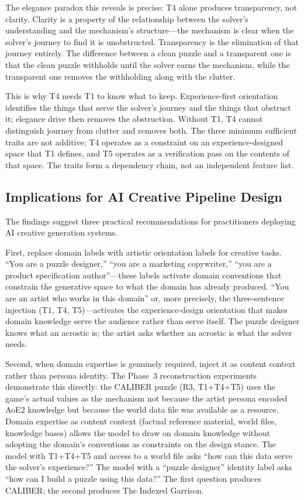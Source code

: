 The elegance paradox this reveals is precise: T4 alone produces transparency, not clarity. Clarity is a property of the relationship between the solver's understanding and the mechanism's structure---the mechanism is clear when the solver's journey to find it is unobstructed. Transparency is the elimination of that journey entirely. The difference between a clean puzzle and a transparent one is that the clean puzzle withholds until the solver earns the mechanism, while the transparent one removes the withholding along with the clutter.

This is why T4 needs T1 to know what to keep. Experience-first orientation identifies the things that serve the solver's journey and the things that obstruct it; elegance drive then removes the obstruction. Without T1, T4 cannot distinguish journey from clutter and removes both. The three minimum sufficient traits are not additive; T4 operates as a constraint on an experience-designed space that T1 defines, and T5 operates as a verification pass on the contents of that space. The traits form a dependency chain, not an independent feature list.

\subsection{Implications for AI Creative Pipeline Design}

The findings suggest three practical recommendations for practitioners deploying AI creative generation systems.

First, replace domain labels with artistic orientation labels for creative tasks. ``You are a puzzle designer,'' ``you are a marketing copywriter,'' ``you are a product specification author''---these labels activate domain conventions that constrain the generative space to what the domain has already produced. ``You are an artist who works in this domain'' or, more precisely, the three-sentence injection (T1, T4, T5)---activates the experience-design orientation that makes domain knowledge serve the audience rather than serve itself. The puzzle designer knows what an acrostic is; the artist asks whether an acrostic is what the solver needs.

Second, when domain expertise is genuinely required, inject it as content context rather than persona identity. The Phase~3 reconstruction experiments demonstrate this directly: the CALIBER puzzle (R3, T1+T4+T5) uses the game's actual values as the mechanism not because the artist persona encoded AoE2 knowledge but because the world data file was available as a resource. Domain expertise as content context (factual reference material, world files, knowledge bases) allows the model to draw on domain knowledge without adopting the domain's conventions as constraints on the design stance. The model with T1+T4+T5 and access to a world file asks ``how can this data serve the solver's experience?'' The model with a ``puzzle designer'' identity label asks ``how can I build a puzzle using this data?'' The first question produces CALIBER; the second produces The Indexed Garrison.

